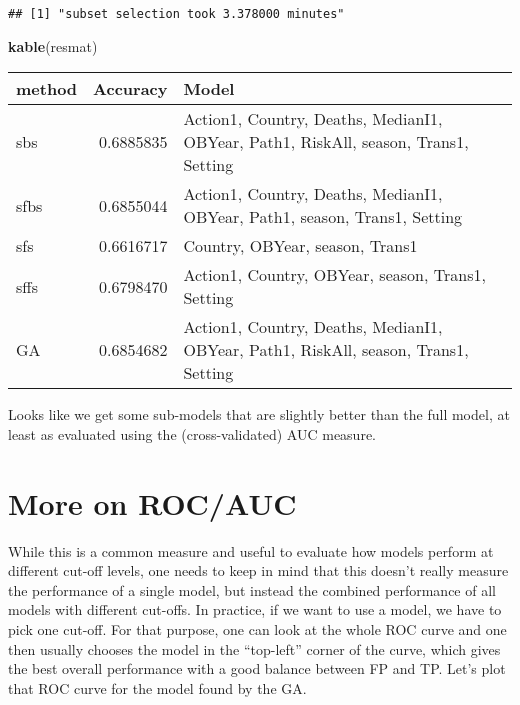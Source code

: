 \documentclass[]{article}
\newenvironment{Shaded}{\begin{snugshade}}{\end{snugshade}}
\newcommand{\CommentTok}[1]{\textcolor[rgb]{0.56,0.35,0.01}{\textit{#1}}}
\newcommand{\DataTypeTok}[1]{\textcolor[rgb]{0.13,0.29,0.53}{#1}}
\newcommand{\DecValTok}[1]{\textcolor[rgb]{0.00,0.00,0.81}{#1}}
\newcommand{\KeywordTok}[1]{\textcolor[rgb]{0.13,0.29,0.53}{\textbf{#1}}}
\newcommand{\NormalTok}[1]{#1}
\newcommand{\OperatorTok}[1]{\textcolor[rgb]{0.81,0.36,0.00}{\textbf{#1}}}
\newcommand{\StringTok}[1]{\textcolor[rgb]{0.31,0.60,0.02}{#1}}
\begin{document}
\begin{verbatim}
## [1] "subset selection took 3.378000 minutes"
\end{verbatim}

\begin{Shaded}
\begin{Highlighting}[]
\KeywordTok{kable}\NormalTok{(resmat)}
\end{Highlighting}
\end{Shaded}

\begin{longtable}[]{@{}lrl@{}}
\toprule
method & Accuracy & Model\tabularnewline
\midrule
\endhead
sbs & 0.6885835 & Action1, Country, Deaths, MedianI1, OBYear, Path1,
RiskAll, season, Trans1, Setting\tabularnewline
sfbs & 0.6855044 & Action1, Country, Deaths, MedianI1, OBYear, Path1,
season, Trans1, Setting\tabularnewline
sfs & 0.6616717 & Country, OBYear, season, Trans1\tabularnewline
sffs & 0.6798470 & Action1, Country, OBYear, season, Trans1,
Setting\tabularnewline
GA & 0.6854682 & Action1, Country, Deaths, MedianI1, OBYear, Path1,
RiskAll, season, Trans1, Setting\tabularnewline
\bottomrule
\end{longtable}

Looks like we get some sub-models that are slightly better than the full
model, at least as evaluated using the (cross-validated) AUC measure.

\hypertarget{more-on-rocauc}{%
\section{More on ROC/AUC}\label{more-on-rocauc}}

While this is a common measure and useful to evaluate how models perform
at different cut-off levels, one needs to keep in mind that this doesn't
really measure the performance of a single model, but instead the
combined performance of all models with different cut-offs. In practice,
if we want to use a model, we have to pick one cut-off. For that
purpose, one can look at the whole ROC curve and one then usually
chooses the model in the ``top-left'' corner of the curve, which gives
the best overall performance with a good balance between FP and TP.
Let's plot that ROC curve for the model found by the GA.

\begin{Shaded}
\end{Shaded}
\end{document}
